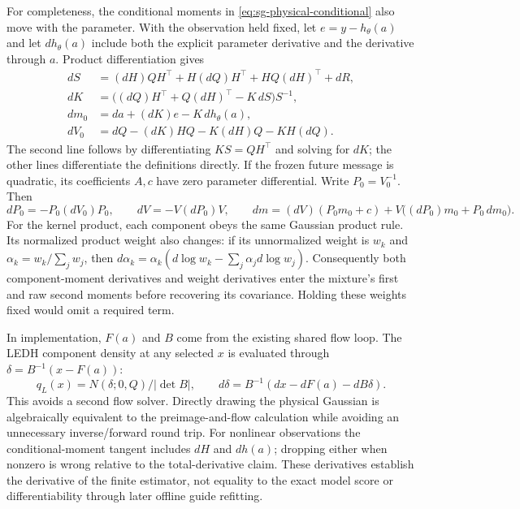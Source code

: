 For completeness, the conditional moments in \eqref{eq:sg-physical-conditional}
also move with the parameter. With the observation held fixed, let
$e=y-h_\theta(a)$ and let $dh_\theta(a)$ include both the explicit parameter
derivative and the derivative through $a$. Product differentiation gives
\begin{align}
 dS&=(dH)QH^\top+H(dQ)H^\top+HQ(dH)^\top+dR,\nonumber\\
 dK&=\bigl((dQ)H^\top+Q(dH)^\top-K\,dS\bigr)S^{-1},\nonumber\\
 dm_0&=da+(dK)e-K\,dh_\theta(a),\label{eq:sg-physical-conditional-tangent}\\
 dV_0&=dQ-(dK)HQ-K(dH)Q-KH(dQ).\nonumber
\end{align}
The second line follows by differentiating $KS=QH^\top$ and solving for
$dK$; the other lines differentiate the definitions directly.
If the frozen future message is quadratic, its coefficients $A,c$ have zero
parameter differential. Write $P_0=V_0^{-1}$. Then
\[
 dP_0=-P_0(dV_0)P_0,\qquad
 dV=-V(dP_0)V,\qquad
 dm=(dV)(P_0m_0+c)+V\bigl((dP_0)m_0+P_0\,dm_0\bigr).
\]
For the kernel product, each component obeys the same Gaussian product rule.
Its normalized product weight also changes: if its unnormalized weight is
$w_k$ and $\alpha_k=w_k/\sum_jw_j$, then
$d\alpha_k=\alpha_k(d\log w_k-\sum_j\alpha_jd\log w_j)$.
Consequently both component-moment derivatives and weight derivatives enter
the mixture's first and raw second moments before recovering its covariance.
Holding these weights fixed would omit a required term.

In implementation, $F(a)$ and $B$ come from the existing shared flow loop.
The LEDH component density at any selected $x$ is evaluated through
$\delta=B^{-1}(x-F(a))$:
\[
 q_L(x)=N(\delta;0,Q)/|\det B|,\qquad
 d\delta=B^{-1}(dx-dF(a)-dB\delta).
\]
This avoids a second flow solver. Directly drawing the physical Gaussian is
algebraically equivalent to the preimage-and-flow calculation while avoiding
an unnecessary inverse/forward round trip. For nonlinear observations the
conditional-moment tangent includes $dH$ and $dh(a)$; dropping either when
nonzero is wrong relative to the total-derivative claim. These derivatives
establish the derivative of the finite estimator, not equality to the exact
model score or differentiability through later offline guide refitting.

